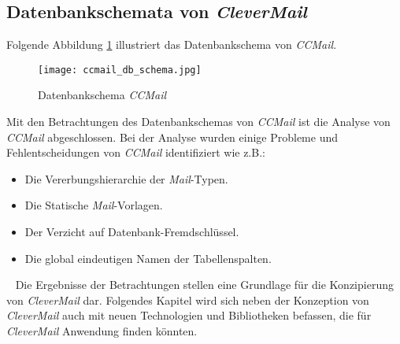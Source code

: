\subsection{Datenbankschemata von \emph{CleverMail}}
Folgende Abbildung \ref{fig:ccmail-db-schema} illustriert das Datenbankschema von \emph{CCMail}.
\begin{figure}[H]
\centering
\texttt{[image: ccmail\_db\_schema.jpg]} 
\caption{Datenbankschema \emph{CCMail}}
\label{fig:ccmail-db-schema}
\end{figure}
Mit den Betrachtungen des Datenbankschemas von \emph{CCMail} ist die Analyse von \emph{CCMail} abgeschlossen. Bei der Analyse wurden einige Probleme und Fehlentscheidungen von \emph{CCMail} identifiziert wie z.B.:
\begin{itemize}
	\item Die Vererbungshierarchie der \emph{Mail}-Typen.
	\item Die Statische \emph{Mail}-Vorlagen.
	\item Der Verzicht auf Datenbank-Fremdschlüssel.
	\item Die global eindeutigen Namen der Tabellenspalten.
\end{itemize}
\ \newline
Die Ergebnisse der Betrachtungen stellen eine Grundlage für die Konzipierung von \emph{CleverMail} dar. Folgendes Kapitel wird sich neben der Konzeption von \emph{CleverMail} auch mit neuen Technologien und Bibliotheken befassen, die für \emph{CleverMail} Anwendung finden könnten. 